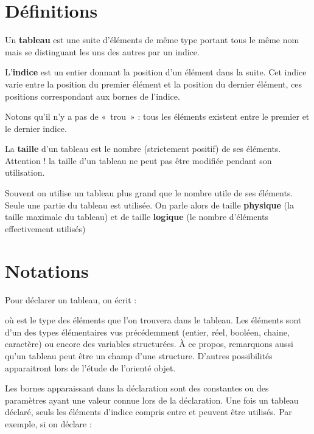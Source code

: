 \section{Définitions}

	Un \textbf{tableau} est une suite d’éléments de même type 
	portant tous le même nom mais se distinguant 
	les uns des autres par un indice.

	L’\textbf{indice} est un entier 
	donnant la position d’un élément dans la suite. 
	Cet indice varie entre la position du premier élément 
	et la position du dernier élément, 
	ces positions correspondant aux bornes de l’indice.

	Notons qu'il n'y a pas de «~trou~» : 
	tous les éléments existent entre le premier et le dernier indice.

	La \textbf{taille} d’un tableau 
	est le nombre (strictement positif) de ses éléments.
	Attention ! la taille d’un tableau ne peut pas être modifiée pendant
	son utilisation.

	Souvent on utilise un tableau plus grand que
	le nombre utile de ses éléments. 
	Seule une partie du tableau est utilisée. 
	On parle alors de taille \textbf{physique}
	(la taille maximale du tableau) 
	et de taille \textbf{logique}
	(le nombre d'éléments effectivement utilisés)

\section{Notations}

	Pour déclarer un tableau, on écrit :

	
	où  est le type des éléments que l’on
	trouvera dans le tableau. Les éléments sont d’un des types élémentaires
	vus précédemment (entier, réel, booléen, chaine, caractère) ou encore
	des variables structurées. À ce propos, remarquons aussi
	qu'un tableau peut être un champ d'une structure. 
	D'autres possibilités apparaitront lors de l'étude de
	l'orienté objet.

	Les bornes apparaissant dans la déclaration sont des constantes ou des
	paramètres ayant une valeur connue lors de la déclaration. Une fois un
	tableau déclaré, seuls les éléments d’indice compris entre
	 et  peuvent
	être utilisés. Par exemple, si on déclare :

